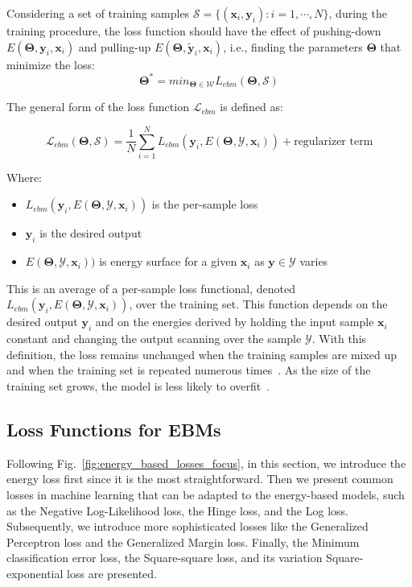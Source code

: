 \documentclass[sn-mathphys-num]{sn-jnl}%
\renewcommand\vec{\mathbf}
\begin{document}
Considering a set of training samples $\mathcal{S} = \{(\vec{x}_i, \vec{y}_i): i=1, \cdots, N\}$, during the training procedure, the loss function should have the effect of pushing-down $E(\vec{\Theta},\vec{y}_i,\vec{x}_i)$ and pulling-up $E(\vec{\Theta}, \tilde{\vec{y}}_i,\vec{x}_i)$, i.e., finding the parameters $\vec{\Theta}$ that minimize the loss: 
\begin{equation}
    \vec{\Theta}^* = min_{\vec{\Theta}\in\mathcal{W}}L_{ebm}(\vec{\Theta},\mathcal{S})
\end{equation}

The general form of the loss function $\mathcal{L}_{ebm}$ is defined as: 

\begin{equation}
    \mathcal{L}_{ebm}(\vec{\Theta},\mathcal{S}) = \frac{1}{N}\sum_{i=1}^N L_{ebm}(\vec{y}_i, E(\vec{\Theta},\mathcal{Y},\vec{x}_i)) + \text{regularizer term}
\end{equation}


Where: 
\begin{itemize}
    \item $L_{ebm}(\vec{y}_i, E(\vec{\Theta},\mathcal{Y},\vec{x}_i))$ is the per-sample loss
    \item $\vec{y}_i$ is the desired output
    \item $E(\vec{\Theta},\mathcal{Y},\vec{x}_i))$ is energy surface for a given $\vec{x}_i$ as $\vec{y} \in \mathcal{Y}$ varies
\end{itemize}

This is an average of a per-sample loss functional, denoted $L_{ebm}(\vec{y}_i, E(\vec{\Theta},\mathcal{Y},\vec{x}_i))$, over the training set. This function depends on the desired output $\vec{y}_i$ and on the energies derived by holding the input sample $\vec{x}_i$ constant and changing the output scanning over the sample $\mathcal{Y}$. 
With this definition, the loss remains unchanged when the training samples are mixed up and when the training set is repeated numerous times~\cite{lecun2006tutorial}. As the size of the training set grows, the model is less likely to overfit~\cite{vapnik1999nature}.

\subsection{Loss Functions for EBMs}
Following Fig.~\ref{fig:energy_based_losses_focus}, in this section, we introduce the energy loss first since it is the most straightforward. Then we present common losses in machine learning that can be adapted to the energy-based models, such as the Negative Log-Likelihood loss, the Hinge loss, and the Log loss. Subsequently, we introduce more sophisticated losses like the Generalized Perceptron loss and the Generalized Margin loss. Finally, the Minimum classification error loss, the Square-square loss, and its variation Square-exponential loss are presented.
\end{document}
